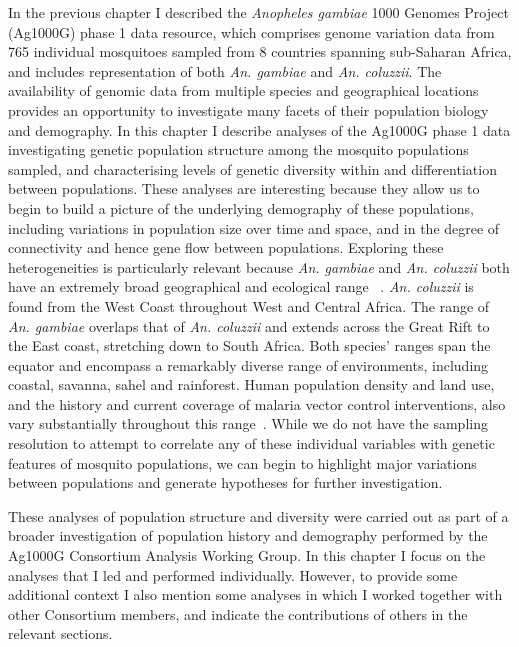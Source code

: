 \begin{refsection}
In the previous chapter I described the \textit{Anopheles gambiae} 1000 Genomes Project (Ag1000G) phase 1 data resource, which comprises genome variation data from 765 individual mosquitoes sampled from 8 countries spanning sub-Saharan Africa, and includes representation of both \textit{An. gambiae} and \textit{An. coluzzii}.
%
The availability of genomic data from multiple species and geographical locations provides an opportunity to investigate many facets of their population biology and demography.
%
In this chapter I describe analyses of the Ag1000G phase 1 data investigating genetic population structure among the mosquito populations sampled, and characterising levels of genetic diversity within and differentiation between populations.
%
These analyses are interesting because they allow us to begin to build a picture of the underlying demography of these populations, including variations in population size over time and space, and in the degree of connectivity and hence gene flow between populations.
%
Exploring these heterogeneities is particularly relevant because \textit{An. gambiae} and \textit{An. coluzzii} both have an extremely broad geographical and ecological range ~\parencite{dellaTorre2001,TeneFossog2015,Wiebe2017}.
%
\textit{An. coluzzii} is found from the West Coast throughout West and Central Africa.
%
The range of \textit{An. gambiae} overlaps that of \textit{An. coluzzii} and extends across the Great Rift to the East coast, stretching down to South Africa.
%
Both species' ranges span the equator and encompass a remarkably diverse range of environments, including coastal, savanna, sahel and rainforest.
%
Human population density and land use, and the history and current coverage of malaria vector control interventions, also vary substantially throughout this range~\parencite{BinswangerMkhize2017,WHO2019WMR}.
%
While we do not have the sampling resolution to attempt to correlate any of these individual variables with genetic features of mosquito populations, we can begin to highlight major variations between populations and generate hypotheses for further investigation.


These analyses of population structure and diversity were carried out as part of a broader investigation of population history and demography performed by the Ag1000G Consortium Analysis Working Group.
%
In this chapter I focus on the analyses that I led and performed individually.
%
However, to provide some additional context I also mention some analyses in which I worked together with other Consortium members, and indicate the contributions of others in the relevant sections.



\end{refsection}
